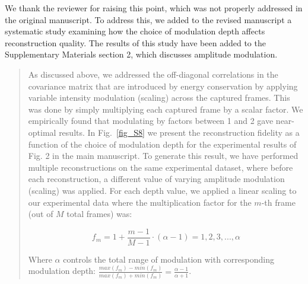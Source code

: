 \documentclass[12pt]{article}
\newenvironment{ourresponse}
    {\begin{tcolorbox}[width=\linewidth,breakable,enhanced,colback=gray!5,colframe=responsecolor!50,title=Response,left=5pt,right=5pt]}
    {\end{tcolorbox}}
\begin{document}
\begin{ourresponse}
We thank the reviewer for raising this point, which was not properly addressed in the original manuscript. To address this, we added to the revised manuscript a systematic study examining how the choice of modulation depth affects reconstruction quality. The results of this study have been added to the Supplementary Materials section 2, which discusses amplitude modulation.



\begin{quote}

As discussed above, we addressed the off-diagonal correlations in the covariance matrix that are introduced by energy conservation by applying variable intensity modulation (scaling) across the captured frames. This was done by simply multiplying each captured frame by a scalar factor. We empirically found that modulating by factors between 1 and 2 gave near-optimal results. In Fig.~\ref{fig_S8} we present the reconstruction fidelity as a function of the choice of modulation depth for the experimental results of Fig. 2 in the main manuscript. To generate this result, we have performed multiple reconstructions on the same experimental dataset, where before each reconstruction, a different value of varying amplitude modulation (scaling) was applied. For each depth value, we applied a linear scaling to our experimental data where the multiplication factor for the $m$-th frame (out of $M$ total frames) was:


\begin{equation}
    f_m = 1 + \frac{m-1}{M-1} \cdot (\alpha -1) = 1, 2, 3, ..., \alpha
\end{equation}

Where $\alpha$ controls the total range of modulation with corresponding modulation depth: $\frac{max(f_m)-min(f_m)}{max(f_m)+min(f_m)}=\frac{\alpha-1}{\alpha+1}$.


\end{quote}
\end{ourresponse}
\end{document}
